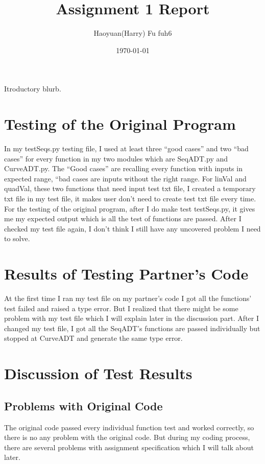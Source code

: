 \documentclass[12pt]{article}
\title{Assignment 1 Report}
\author{Haoyuan(Harry) Fu fuh6}
\date{\today}
\begin{document}
\maketitle
Itroductory blurb.

\section{Testing of the Original Program}
In my testSeqs.py testing file, I used at least three “good cases” and two “bad cases” for every function in my two modules which are SeqADT.py and CurveADT.py. The “Good cases” are recalling every function with inputs in expected range, “bad cases are inputs without the right range. For linVal and quadVal, these two functions that need input test txt file, I created a temporary txt file in my test file, it makes user don’t need to create test txt file every time. For the testing of the original program, after I do make test testSeqs.py, it gives me my expected output which is all the test of functions are passed. After I checked my test file again, I don’t think I still have any uncovered problem I need to solve.


\section{Results of Testing Partner's Code}
At the first time I ran my test file on my partner’s code I got all the functions’ test failed and raised a type error. But I realized that there might be some problem with my test file which I will explain later in the discussion part. After I changed my test file, I got all the SeqADT’s functions are passed individually but stopped at CurveADT and generate the same type error.

\section{Discussion of Test Results}

\subsection{Problems with Original Code}
The original code passed every individual function test and worked correctly, so there is no any problem with the original code. But during my coding process, there are several problems with assignment specification which I will talk about later.
\end{document}
